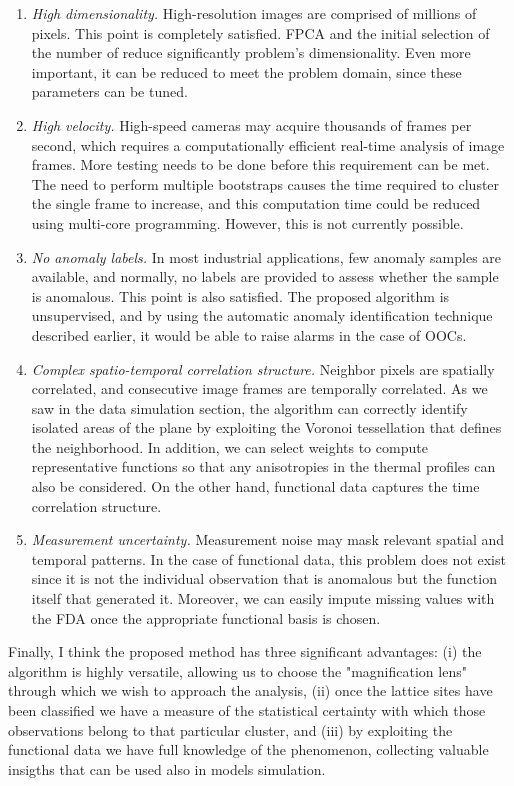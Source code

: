 \begin{enumerate}
    \item \textit{High dimensionality.} High-resolution images are comprised of millions of pixels. This point is completely satisfied. FPCA and the initial selection of the number of reduce significantly problem's dimensionality. Even more important, it can be reduced to meet the problem domain, since these parameters can be tuned.
    \item \textit{High velocity.} High-speed cameras may acquire thousands of frames per second, which requires a computationally efficient real-time analysis of image frames. More testing needs to be done before this requirement can be met. The need to perform multiple bootstraps causes the time required to cluster the single frame to increase, and this computation time could be reduced using multi-core programming. However, this is not currently possible.
    \item \textit{No anomaly labels.} In most industrial applications, few anomaly samples are available, and normally, no labels are provided to assess whether the sample is anomalous. This point is also satisfied. The proposed algorithm is unsupervised, and by using the automatic anomaly identification technique described earlier, it would be able to raise alarms in the case of OOCs.
    \item \textit{Complex spatio-temporal correlation structure.} Neighbor pixels are spatially correlated, and consecutive image frames are temporally correlated. As we saw in the data simulation section, the algorithm can correctly identify isolated areas of the plane by exploiting the Voronoi tessellation that defines the neighborhood. In addition, we can select weights to compute representative functions so that any anisotropies in the thermal profiles can also be considered. On the other hand, functional data captures the time correlation structure.
    \item \textit{Measurement uncertainty.} Measurement noise may mask relevant spatial and temporal patterns. In the case of functional data, this problem does not exist since it is not the individual observation that is anomalous but the function itself that generated it. Moreover, we can easily impute missing values with the FDA once the appropriate functional basis is chosen.
\end{enumerate}
Finally, I think the proposed method has three significant advantages: (i) the algorithm is highly versatile, allowing us to choose the "magnification lens" through which we wish to approach the analysis, (ii) once the lattice sites have been classified we have a measure of the statistical certainty with which those observations belong to that particular cluster, and (iii) by exploiting the functional data we have full knowledge of the phenomenon, collecting valuable insigths that can be used also in models simulation.
